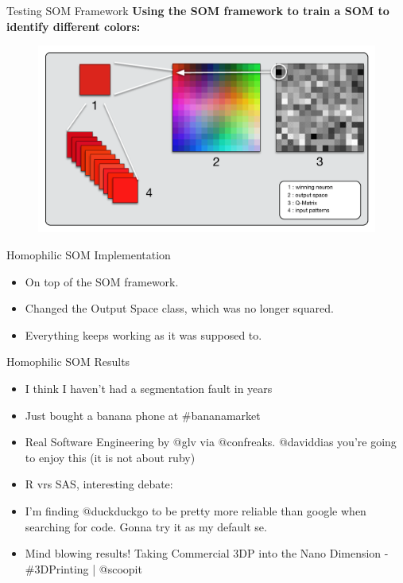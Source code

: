 \begin{frame}{Testing SOM Framework}
  \textbf{Using the SOM framework to train a SOM to identify different colors:}
  \begin{figure}
    \includegraphics[width=1\textwidth]{images/som_trainned.pdf}
  \end{figure}
\end{frame}

\begin{frame}{Homophilic SOM Implementation}
  \begin{itemize}
    \item On top of the SOM framework.
    \item Changed the Output Space class, which was no longer squared.
    \item Everything keeps working as it was supposed to.
  \end{itemize}
\end{frame}

\begin{frame}{Homophilic SOM Results}
  \begin{itemize}
    \item I think I haven't had a segmentation fault in years
    \item Just bought a banana phone at \#bananamarket
    \item Real Software Engineering by @glv via @confreaks. @daviddias you're going to enjoy this (it is not about ruby)
    \item R vrs SAS, interesting debate: 
    \item I'm finding @duckduckgo to be pretty more reliable than google when searching for code. Gonna try it as my default se.
    \item Mind blowing results! Taking Commercial 3DP into the Nano Dimension - \#3DPrinting | @scoopit 
  \end{itemize}
\end{frame}
